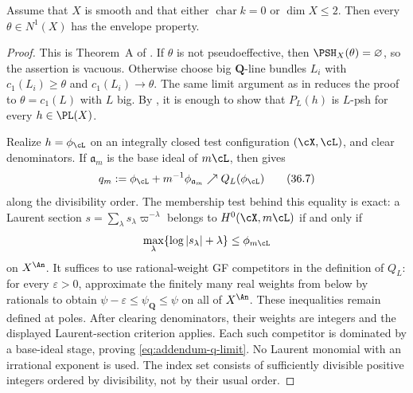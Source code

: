 \begin{theorem}\label{thm:bj-addendum-all-classes}
Assume that $X$ is smooth and that either
$\operatorname{char}k=0$ or $\dim X\leq2$.  Then every
$\theta\in N^1(X)$ has the envelope property.
\end{theorem}

\begin{proof}
This is Theorem~A of \cite{BJ22b}.  If $\theta$ is not pseudoeffective,
then $\PSH_X(\theta)=\varnothing$, so the assertion is vacuous.  Otherwise
choose big $\mathbf Q$-line bundles $L_i$ with
$c_1(L_i)\geq\theta$ and $c_1(L_i)\to\theta$.  The same limit argument
as in \cite[Lemma~5.9]{BJ22} reduces the proof to
$\theta=c_1(L)$ with $L$ big.  By
, it is enough to show that
$P_L(h)$ is $L$-psh for every $h\in\PL(X)$.

Realize $h=\phi_{\cL}$ on an integrally closed test configuration
$(\cX,\cL)$, and clear denominators.  If $\mathfrak a_m$ is the base
ideal of $m\cL$, then \cite[Lemmas~1.6--1.7]{BJ22b} gives
\[
 q_m:=\phi_{\cL}+m^{-1}\phi_{\mathfrak a_m}
       \nearrow Q_L(\phi_{\cL})
\tag{36.7}\label{eq:addendum-q-limit}
\]
along the divisibility order.  The membership test behind this equality is
exact: a Laurent section
$s=\sum_\lambda s_\lambda\varpi^{-\lambda}$ belongs to
$H^0(\cX,m\cL)$ if and only if
\[
 \max_\lambda\{\log|s_\lambda|+\lambda\}
       \leq\phi_{m\cL}
\]
on $X^{\An}$.  It suffices to use rational-weight GF competitors in the definition of
$Q_L$: for every $\varepsilon>0$, approximate the finitely many real weights
from below by rationals to obtain $\psi-\varepsilon\leq\psi_{\mathbf Q}\leq\psi$
on all of $X^{\An}$. These inequalities remain defined at poles. After clearing denominators, their
weights are integers and the displayed Laurent-section criterion applies.
Each such competitor is dominated by a base-ideal stage, proving
\eqref{eq:addendum-q-limit}. No Laurent monomial with an irrational
exponent is used.  The index set consists of sufficiently divisible
positive integers ordered by divisibility, not by their usual order.


\end{proof}
